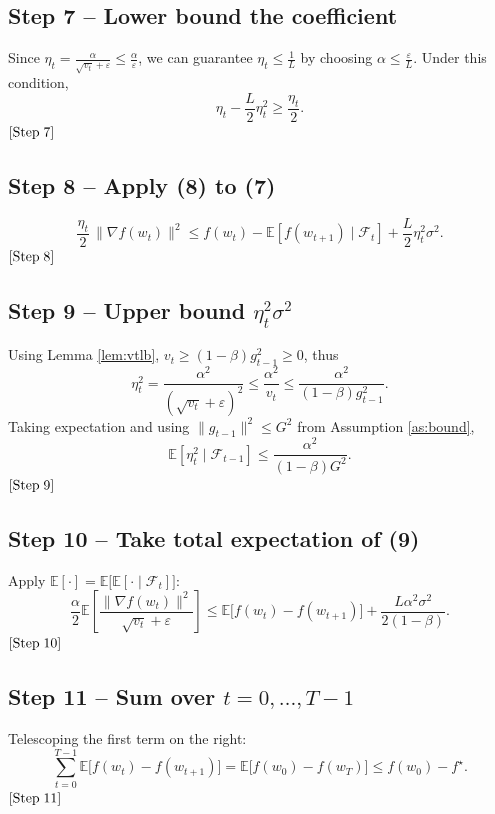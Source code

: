 \documentclass{article}
\newcommand{\E}{\mathbb{E}}
\begin{document}
\subsection*{Step 7 – Lower bound the coefficient}
Since $\eta_{t}= \frac{\alpha}{\sqrt{v_{t}}+\varepsilon}\le\frac{\alpha}{\varepsilon}$, we can guarantee
\(\eta_{t}\le \frac{1}{L}\) by choosing $\alpha\le\frac{\varepsilon}{L}$.  
Under this condition,
\[
\eta_{t}-\frac{L}{2}\eta_{t}^{2}
\ge \frac{\eta_{t}}{2}.                                         \tag{8}
\]
\([{\rm Step}\;7]\)

\subsection*{Step 8 – Apply (8) to (7)}
\[
\frac{\eta_{t}}{2}\,\|\nabla f(w_{t})\|^{2}
\le f(w_{t})-\E\!\left[f(w_{t+1})\mid\mathcal{F}_{t}\right]
    +\frac{L}{2}\eta_{t}^{2}\sigma^{2}.                         \tag{9}
\]
\([{\rm Step}\;8]\)

\subsection*{Step 9 – Upper bound $\eta_{t}^{2}\sigma^{2}$}
Using Lemma \ref{lem:vtlb}, $v_{t}\ge (1-\beta)g_{t-1}^{2}\ge0$, thus
\[
\eta_{t}^{2}
   =\frac{\alpha^{2}}{( \sqrt{v_{t}}+\varepsilon)^{2}}
   \le\frac{\alpha^{2}}{v_{t}}   
   \le \frac{\alpha^{2}}{(1-\beta)g_{t-1}^{2}}.
\]
Taking expectation and using $\|g_{t-1}\|^{2}\le G^{2}$ from Assumption \ref{as:bound},
\[
\E[\eta_{t}^{2}\mid\mathcal{F}_{t-1}]
\le\frac{\alpha^{2}}{(1-\beta)G^{2}}.                         \tag{10}
\]
\([{\rm Step}\;9]\)

\subsection*{Step 10 – Take total expectation of (9)}
Apply $\E[\cdot]=\E\big[\E[\cdot\mid\mathcal{F}_{t}]\big]$:
\[
\frac{\alpha}{2}\E\!\left[\frac{\|\nabla f(w_{t})\|^{2}}{\sqrt{v_{t}}+\varepsilon}\right]
\le \E\!\big[f(w_{t})-f(w_{t+1})\big]
    +\frac{L\alpha^{2}\sigma^{2}}{2(1-\beta)}.                \tag{11}
\]
\([{\rm Step}\;10]\)

\subsection*{Step 11 – Sum over $t=0,\dots,T-1$}
Telescoping the first term on the right:
\[
\sum_{t=0}^{T-1}\E\!\big[f(w_{t})-f(w_{t+1})\big]
= \E\!\big[f(w_{0})-f(w_{T})\big]
\le f(w_{0})-f^{\star}.                                      \tag{12}
\]
\([{\rm Step}\;11]\)
\end{document}
